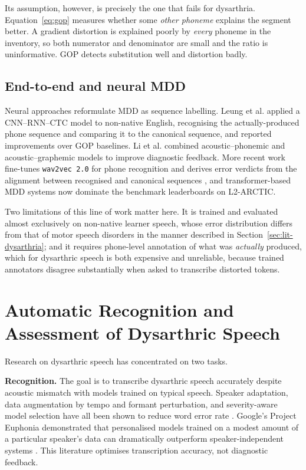 Its assumption, however, is precisely the one that fails for dysarthria.
Equation~\eqref{eq:gop} measures whether some \emph{other phoneme} explains the
segment better. A gradient distortion is explained poorly by \emph{every}
phoneme in the inventory, so both numerator and denominator are small and the
ratio is uninformative. GOP detects substitution well and distortion badly.

\subsection{End-to-end and neural MDD}

Neural approaches reformulate MDD as sequence labelling. Leung et al.
\cite{leung2019cnn} applied a CNN--RNN--CTC model to non-native English,
recognising the actually-produced phone sequence and comparing it to the
canonical sequence, and reported improvements over GOP baselines. Li et al.
\cite{li2016mispronunciation} combined acoustic--phonemic and
acoustic--graphemic models to improve diagnostic feedback. More recent work
fine-tunes \texttt{wav2vec\,2.0} for phone recognition and derives error
verdicts from the alignment between recognised and canonical sequences
\cite{xu2021explore}, and transformer-based MDD systems now dominate the
benchmark leaderboards on L2-ARCTIC.

Two limitations of this line of work matter here. It is trained and evaluated
almost exclusively on non-native learner speech, whose error distribution
differs from that of motor speech disorders in the manner described in
Section~\ref{sec:lit-dysarthria}; and it requires phone-level annotation of
what was \emph{actually} produced, which for dysarthric speech is both
expensive and unreliable, because trained annotators disagree substantially
when asked to transcribe distorted tokens.

\section{Automatic Recognition and Assessment of Dysarthric Speech}
\label{sec:lit-dysarthric-asr}

Research on dysarthric speech has concentrated on two tasks.

\textbf{Recognition.} The goal is to transcribe dysarthric speech accurately
despite acoustic mismatch with models trained on typical speech. Speaker
adaptation, data augmentation by tempo and formant perturbation, and
severity-aware model selection have all been shown to reduce word error rate
\cite{shor2019personalizing,geng2022speaker}. Google's Project Euphonia
demonstrated that personalised models trained on a modest amount of a
particular speaker's data can dramatically outperform speaker-independent
systems \cite{macdonald2021disordered}. This literature optimises transcription
accuracy, not diagnostic feedback.

